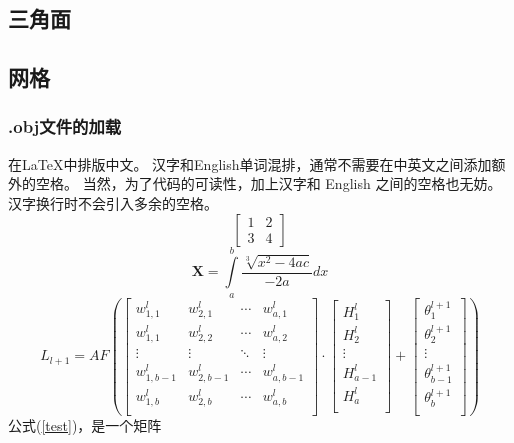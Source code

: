 \documentclass[12pt,oneside,a4paper]{ctexart}
\begin{document}
\subsection{三角面}
\subsection{网格}
\subsubsection{.obj文件的加载}
在\LaTeX{}中排版中文。
汉字和English单词混排，通常不需要在中英文之间添加额外的空格。
当然，为了代码的可读性，加上汉字和 English 之间的空格也无妨。
汉字换行时不会引入多余的空格。
\begin{equation}
	\begin{bmatrix}
		1 & 2 \\
		3 & 4
	\end{bmatrix}
	\label{test}
\end{equation}
\begin{equation}
	\mathbf{X}=\int\limits_{a}^{b} \frac{\sqrt[3]{x^2-4ac} }{-2a} dx
\end{equation}
\begin{equation}
	L_{l+1}=AF\left(
	\begin{bmatrix}
			w^l_{1,1}   & w^l_{2,1}   & \cdots & w^l_{a,1}   \\
			w^l_{1,1}   & w^l_{2,2}   & \cdots & w^l_{a,2}   \\
			\vdots      & \vdots      & \ddots & \vdots      \\
			w^l_{1,b-1} & w^l_{2,b-1} & \cdots & w^l_{a,b-1} \\
			w^l_{1,b}   & w^l_{2,b}   & \cdots & w^l_{a,b}   \\
		\end{bmatrix}
	\cdot
	\begin{bmatrix}
			H^l_1     \\
			H^l_2     \\
			\vdots    \\
			H^l_{a-1} \\
			H^l_{a}   \\
		\end{bmatrix}
	+
	\begin{bmatrix}
			\theta{}^{l+1}_1     \\
			\theta{}^{l+1}_2     \\
			\vdots               \\
			\theta{}^{l+1}_{b-1} \\
			\theta{}^{l+1}_{b}   \\
		\end{bmatrix}
	\right)\label{test2}
\end{equation}
公式(\ref{test})，是一个矩阵
\end{document}
